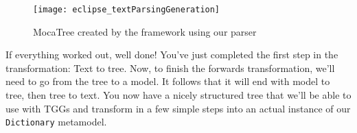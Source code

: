 \begin{figure}[!htbp]
\begin{center}
 \texttt{[image: eclipse\_textParsingGeneration]}
  \caption{MocaTree created by the framework using our parser}
  \label{eclipse:treeResult}
\end{center}
\end{figure}

If everything worked out, well done! You've just completed the first step in the transformation: Text to tree. Now, to finish the forwards transformation,
we'll need to go from the tree to a model. It follows that it will end with model to tree, then tree to text. You now have a nicely structured tree that we'll
be able to use with TGGs and transform in a few simple steps into an actual instance of our \texttt{Dictionary} metamodel.
